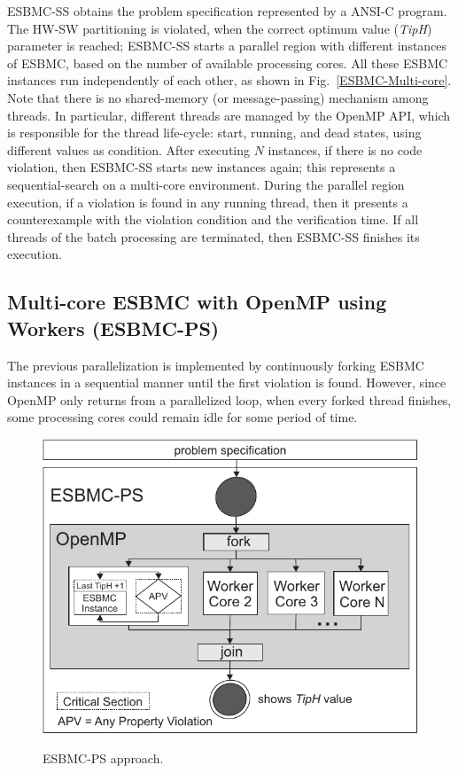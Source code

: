 \documentclass{doublecol-new}
\theoremstyle{TH}{
\newtheorem{lemma}{Lemma}
\newtheorem{theorem}[lemma]{Theorem}
\newtheorem{corrolary}[lemma]{Corrolary}
\newtheorem{conjecture}[lemma]{Conjecture}
\newtheorem{proposition}[lemma]{Proposition}
\newtheorem{claim}[lemma]{Claim}
\newtheorem{stheorem}[lemma]{Wrong Theorem}
\newtheorem{algorithm}{Algorithm}
}
\theoremstyle{THrm}{
\newtheorem{definition}{Definition}[section]
\newtheorem{question}{Question}[section]
\newtheorem{remark}{Remark}
\newtheorem{scheme}{Scheme}
}
\theoremstyle{THhit}{
\newtheorem{case}{Case}[section]
}
\begin{document}
ESBMC-SS obtains the problem specification represented by a ANSI-C program. The HW-SW partitioning is violated, when the correct optimum value (\textit{TipH}) parameter is reached; ESBMC-SS starts a parallel region with different instances of ESBMC, based on the number of available processing cores. All these ESBMC instances run independently of each other, as shown in Fig.~\ref{ESBMC-Multi-core}. Note that there is no shared-memory (or message-passing) mechanism among threads. In particular, different threads are managed by the OpenMP API, which is responsible for the thread life-cycle: start, running, and dead states, using different values as condition. After executing $N$ instances, if there is no code violation, then ESBMC-SS starts new instances again; this represents a sequential-search on a multi-core environment. During the parallel region execution, if a violation is found in any running thread, then it presents a counterexample with the violation condition and the verification time. If all threads of the batch processing are terminated, then ESBMC-SS finishes its execution.

\subsection{Multi-core ESBMC with OpenMP using Workers (ESBMC-PS)}
\label{Multi-core-ESBMC-with-OpenMP-using-workers}

The previous parallelization is implemented by continuously forking ESBMC instances in a sequential manner until the first violation is found. However, since OpenMP only returns from a parallelized loop, when every forked thread finishes, some processing cores could remain idle for some period of time.

\begin{figure}[h]
	\caption{ESBMC-PS approach.}
	\centering
	\includegraphics[scale=0.77]{figures/esbmc-ps.pdf} 	
	\label{ESBMC-Multi-core-Optimized-Sequential-Approach}
\end{figure}
\end{document}
